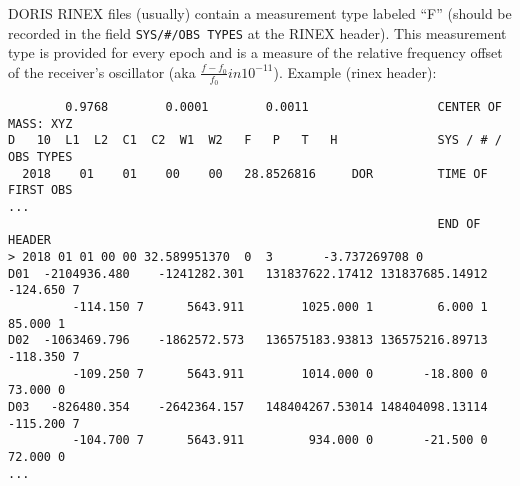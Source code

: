 DORIS RINEX files (usually) contain a measurement type labeled ``F'' (should be 
recorded in the field \verb|SYS/#/OBS TYPES| at the RINEX header). This measurement 
type is provided for every epoch and is a measure of the relative frequency 
offset of the receiver's oscillator (aka \(\frac{f-f_0}{f_0} in 10^{-11}\)).
Example (rinex header):
\begin{verbatim}
        0.9768        0.0001        0.0011                  CENTER OF MASS: XYZ
D   10  L1  L2  C1  C2  W1  W2   F   P   T   H              SYS / # / OBS TYPES
  2018    01    01    00    00   28.8526816     DOR         TIME OF FIRST OBS
...
                                                            END OF HEADER
> 2018 01 01 00 00 32.589951370  0  3       -3.737269708 0
D01  -2104936.480    -1241282.301   131837622.17412 131837685.14912      -124.650 7
         -114.150 7      5643.911        1025.000 1         6.000 1        85.000 1
D02  -1063469.796    -1862572.573   136575183.93813 136575216.89713      -118.350 7
         -109.250 7      5643.911        1014.000 0       -18.800 0        73.000 0
D03   -826480.354    -2642364.157   148404267.53014 148404098.13114      -115.200 7
         -104.700 7      5643.911         934.000 0       -21.500 0        72.000 0
...                                                            
\end{verbatim}

